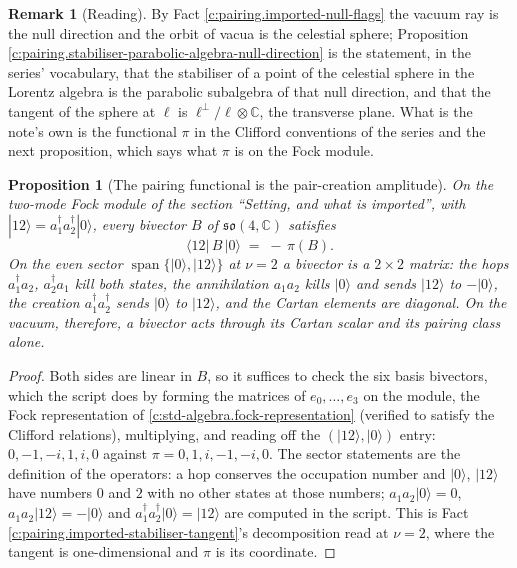 \documentclass[11pt]{article}
\newtheorem{proposition}[theorem]{Proposition}
\theoremstyle{definition}
\newtheorem{remark}[theorem]{Remark}
\theoremstyle{plain}
\providecommand{\C}{}\renewcommand{\C}{\mathbb{C}}
\providecommand{\pv}{}\renewcommand{\pv}{\pi}
\providecommand{\so}{}\renewcommand{\so}{\mathfrak{so}}
\providecommand{\bra}{}\renewcommand{\bra}[1]{\langle #1|}
\providecommand{\ket}{}\renewcommand{\ket}[1]{|#1\rangle}
\begin{document}
\begin{remark}[Reading]\label{c:note.pairing.reading}
By Fact \ref{c:pairing.imported-null-flags} the vacuum ray is the null direction and the orbit of vacua is the celestial sphere; Proposition \ref{c:pairing.stabiliser-parabolic-algebra-null-direction} is the statement, in the series' vocabulary, that the stabiliser of a point of the celestial sphere in the Lorentz algebra is the parabolic subalgebra of that null direction, and that the tangent of the sphere at $\ell$ is $\ell^{\perp}/\ell \otimes \C$, the transverse plane. What is the note's own is the functional $\pv$ in the Clifford conventions of the series and the next proposition, which says what $\pv$ is on the Fock module.
\end{remark}

\begin{proposition}[The pairing functional is the pair-creation amplitude]\label{c:pairing.pairing-functional-pair-creation-amplitude}
On the two-mode Fock module of the section ``Setting, and what is imported'', with $\ket{12} = a_{1}^{\dagger}a_{2}^{\dagger}\ket{0}$, every bivector $B$ of $\so(4,\C)$ satisfies
\[
\bra{12}\,B\,\ket{0} \;=\; -\,\pv(B) .
\]
On the even sector $\operatorname{span}\{\ket{0}, \ket{12}\}$ at $\nu = 2$ a bivector is a $2 \times 2$ matrix: the hops $a_{1}^{\dagger}a_{2}$, $a_{2}^{\dagger}a_{1}$ kill both states, the annihilation $a_{1}a_{2}$ kills $\ket{0}$ and sends $\ket{12}$ to $-\ket{0}$, the creation $a_{1}^{\dagger}a_{2}^{\dagger}$ sends $\ket{0}$ to $\ket{12}$, and the Cartan elements are diagonal. On the vacuum, therefore, a bivector acts through its Cartan scalar and its pairing class alone.
\end{proposition}
\begin{proof}
Both sides are linear in $B$, so it suffices to check the six basis bivectors, which the script does by forming the matrices of $e_{0}, \dots, e_{3}$ on the module, the Fock representation of \ref{c:std-algebra.fock-representation} (verified to satisfy the Clifford relations), multiplying, and reading off the $(\ket{12}, \ket{0})$ entry: $0, -1, -i, 1, i, 0$ against $\pv = 0, 1, i, -1, -i, 0$. The sector statements are the definition of the operators: a hop conserves the occupation number and $\ket{0}$, $\ket{12}$ have numbers $0$ and $2$ with no other states at those numbers; $a_{1}a_{2}\ket{0} = 0$, $a_{1}a_{2}\ket{12} = -\ket{0}$ and $a_{1}^{\dagger}a_{2}^{\dagger}\ket{0} = \ket{12}$ are computed in the script. This is Fact \ref{c:pairing.imported-stabiliser-tangent}'s decomposition read at $\nu = 2$, where the tangent is one-dimensional and $\pv$ is its coordinate.

\end{proof}
\end{document}
